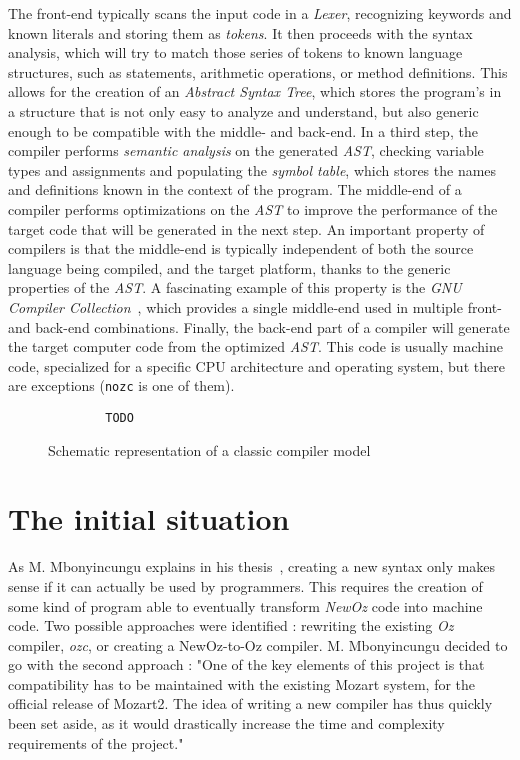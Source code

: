 The front-end typically scans the input code in a \textit{Lexer}, recognizing keywords and known literals and storing them as \textit{tokens}.
It then proceeds with the syntax analysis, which will try to match those series of tokens to known language structures, such as statements, arithmetic operations, or method definitions.
This allows for the creation of an \textit{Abstract Syntax Tree}, which stores the program's in a structure that is not only easy to analyze and understand, but also generic enough to be compatible with the middle- and back-end.
In a third step, the compiler performs \textit{semantic analysis} on the generated \textit{AST}, checking variable types and assignments and populating the \textit{symbol table}, which stores the names and definitions known in the context of the program.
The middle-end of a compiler performs optimizations on the \textit{AST} to improve the performance of the target code that will be generated in the next step.
An important property of compilers is that the middle-end is typically independent of both the source language being compiled, and the target platform, thanks to the generic properties of the \textit{AST}.
A fascinating example of this property is the \textit{GNU Compiler Collection}~\cite{gcc}, which provides a single middle-end used in multiple front- and back-end combinations.
Finally, the back-end part of a compiler will generate the target computer code from the optimized \textit{AST}.
This code is usually machine code, specialized for a specific CPU architecture and operating system, but there are exceptions (\texttt{nozc} is one of them).
\begin{figure}
    \begin{lstlisting}
        TODO
    \end{lstlisting}
    \caption{Schematic representation of a classic compiler model}
\end{figure}

\section{The initial situation}\label{sec:ch3-Parser}
As M. Mbonyincungu explains in his thesis~\cite{jpthesis}, creating a new syntax only makes sense if it can actually be used by programmers.
This requires the creation of some kind of program able to eventually transform \textit{NewOz} code into machine code.
Two possible approaches were identified : rewriting the existing \textit{Oz} compiler, \textit{ozc}, or creating a NewOz-to-Oz compiler.
M. Mbonyincungu decided to go with the second approach :
"One of the key elements of this project is that compatibility has to be maintained with the existing Mozart system, for the official release of Mozart2.
The idea of writing a new compiler has thus quickly been set aside, as it would drastically increase the time and complexity requirements of the project."~\cite{jpthesis}


